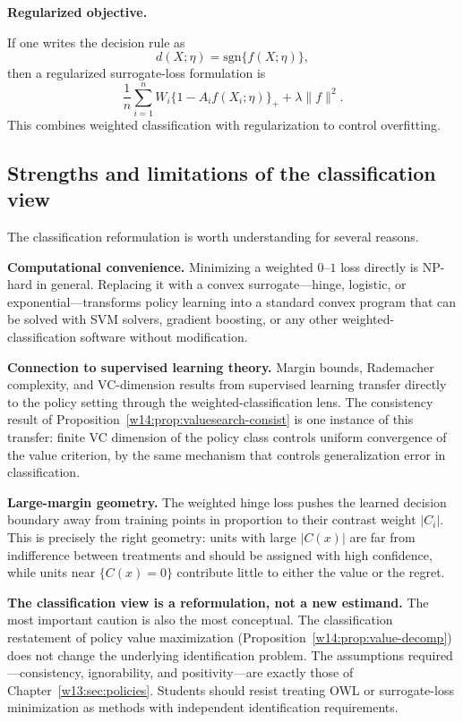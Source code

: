 \documentclass[master.tex]{subfiles}
\begin{document}
\medskip\noindent\textbf{Regularized objective.}

If one writes the decision rule as
\[
d(X;\eta)=\mathrm{sgn}\{f(X;\eta)\},
\]
then a regularized surrogate-loss formulation is
\[
\frac{1}{n}\sum_{i=1}^n W_i\{1-A_i f(X_i;\eta)\}_+ + \lambda \|f\|^2.
\]
This combines weighted classification with regularization to control overfitting.

\subsection{Strengths and limitations of the classification view}
\label{w14:subsec:class-limits}

The classification reformulation is worth understanding for several reasons.

\textbf{Computational convenience.} Minimizing a weighted \(0\)\nobreakdash--\(1\) loss directly is NP-hard in general. Replacing it with a convex surrogate---hinge, logistic, or exponential---transforms policy learning into a standard convex program that can be solved with SVM solvers, gradient boosting, or any other weighted-classification software without modification.

\textbf{Connection to supervised learning theory.} Margin bounds, Rademacher complexity, and VC-dimension results from supervised learning transfer directly to the policy setting through the weighted-classification lens. The consistency result of Proposition~\ref{w14:prop:valuesearch-consist} is one instance of this transfer: finite VC dimension of the policy class controls uniform convergence of the value criterion, by the same mechanism that controls generalization error in classification.

\textbf{Large-margin geometry.} The weighted hinge loss pushes the learned decision boundary away from training points in proportion to their contrast weight \(|C_i|\). This is precisely the right geometry: units with large \(|C(x)|\) are far from indifference between treatments and should be assigned with high confidence, while units near \(\{C(x)=0\}\) contribute little to either the value or the regret.

\textbf{The classification view is a reformulation, not a new estimand.} The most important caution is also the most conceptual. The classification restatement of policy value maximization (Proposition~\ref{w14:prop:value-decomp}) does not change the underlying identification problem. The assumptions required---consistency, ignorability, and positivity---are exactly those of Chapter~\ref{w13:sec:policies}. Students should resist treating OWL or surrogate-loss minimization as methods with independent identification requirements.
\end{document}
